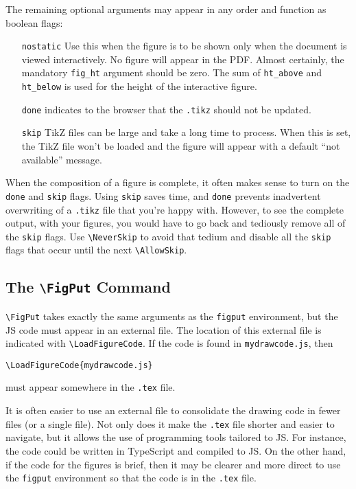 \documentclass[10pt]{article}
\begin{document}
The remaining optional arguments may appear in any order and function
as boolean flags:

\begin{itemize}[itemsep=-1pt,leftmargin=2cm]
  \item[{\tt nostatic}] Use this when the figure is to be shown only
    when the document is viewed interactively. No figure will appear
    in the PDF. Almost certainly, the mandatory \verb=fig_ht= argument
    should be zero. The sum of \verb=ht_above= and \verb=ht_below= is
    used for the height of the interactive figure.
  \item[{\tt done}] indicates to the browser that the {\tt .tikz}
    should not be updated.
  \item[{\tt skip}] TikZ files can be large and take a long time to
    process. When this is set, the TikZ file won't be loaded and the
    figure will appear with a default ``not available'' message.
\end{itemize}

When the composition of a figure is complete, it often makes sense to
turn on the {\tt done} and {\tt skip} flags. Using {\tt skip} saves
time, and {\tt done} prevents inadvertent overwriting of a {\tt .tikz}
file that you're happy with. However, to see the complete output, with
your figures, you would have to go back and tediously remove all of
the {\tt skip} flags. Use \verb=\NeverSkip= to avoid that tedium and
disable all the {\tt skip} 
flags that occur until the next \verb=\AllowSkip=. 

\subsection*{The {\tt \textbackslash FigPut} Command}

\verb=\FigPut= takes exactly the same arguments as the {\tt figput}
environment, but the JS code must appear in an external file. The
location of this external file is indicated with
\verb=\LoadFigureCode=. If the code is found in {\tt mydrawcode.js},
then
\begin{verbatim}
\LoadFigureCode{mydrawcode.js}
\end{verbatim}
must appear somewhere in the {\tt .tex} file.

It is often easier to use an external file to consolidate the drawing
code in fewer files (or a single file). Not only
does it make the {\tt .tex} file shorter and easier to navigate, but it
allows the use of programming tools tailored to JS. For instance,
the code could be written in TypeScript and compiled to JS. On the other
hand, if the code for the figures is brief, then it may be clearer and more
direct to use the {\tt figput} environment so that the code is in the
{\tt .tex} file. 
\end{document}

